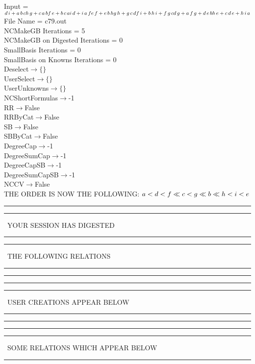 \documentclass[rep10,leqno]{report}
\begin{document}
\normalsize
\baselineskip=12pt
\noindent
Input = 
$
\\d\,
 i + a\,
 b\,
 c\\
h\,
 g + c\,
 a\,
 b\\
f\,
 e + b\,
 c\,
 a\\
i\,
 d + i\,
 a\,
 f\\
e\,
 f + e\,
 b\,
 h\\
g\,
 h + g\,
 c\,
 d\\
f\,
 i + b\,
 h\,
 i + f\,
 g\,
 c\\
d\,
 g + a\,
 f\,
 g + d\,
 e\,
 b\\
h\,
 e + c\,
 d\,
 e + h\,
 i\,
 a\\
$
File Name = c79.out\\
NCMakeGB Iterations = 5\\
NCMakeGB on Digested Iterations = 0\\
SmallBasis Iterations = 0\\
SmallBasis on Knowns Iterations = 0\\
Deselect$\rightarrow \{\}$\\
UserSelect$\rightarrow \{\}$\\
UserUnknowns$\rightarrow \{\}$\\
NCShortFormulas$\rightarrow$-1\\
RR$\rightarrow $False\\
RRByCat$\rightarrow $False\\
SB$\rightarrow $False\\
SBByCat$\rightarrow $False\\
DegreeCap$\rightarrow $-1\\
DegreeSumCap$\rightarrow $-1\\
DegreeCapSB$\rightarrow $-1\\
DegreeSumCapSB$\rightarrow $-1\\
NCCV$\rightarrow $False\\
THE ORDER IS NOW THE FOLLOWING:\hfil\break
$
a<d<f\ll
c<g\ll
b\ll
h<i<e\\
$
\rule[2pt]{6in}{4pt}\hfil\break
\rule[2pt]{1.879in}{4pt}
\ YOUR SESSION HAS DIGESTED\ 
\rule[2pt]{1.879in}{4pt}\hfil\break
\rule[2pt]{1.923in}{4pt}
\ THE FOLLOWING RELATIONS\ 
\rule[2pt]{1.923in}{4pt}\hfil\break
\rule[2pt]{6in}{4pt}\hfil\break
\rule[2pt]{6in}{1pt}\hfil\break
\rule[2.5pt]{1.701in}{1pt}
\ USER CREATIONS APPEAR BELOW\ 
\rule[2.5pt]{1.701in}{1pt}\hfil\break
\rule[2pt]{6in}{1pt}\hfil\break
\rule[2pt]{6in}{4pt}\hfil\break
\rule[2pt]{1.45in}{4pt}
\ SOME RELATIONS WHICH APPEAR BELOW\ 
\rule[2pt]{1.45in}{4pt}\hfil\break
\end{document}
